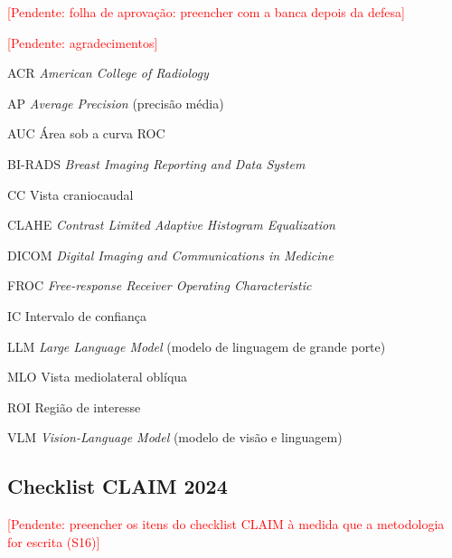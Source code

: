 \documentclass[12pt, openright, oneside, a4paper, chapter=TITLE, english, brazil]{abntex2}
\newcommand{\pendente}[1]{\textcolor{red}{[Pendente: #1]}}
\begin{document}
\frenchspacing

\imprimircapa
\imprimirfolhaderosto

\begin{folhadeaprovacao}
  \pendente{folha de aprovação: preencher com a banca depois da defesa}
\end{folhadeaprovacao}

\begin{agradecimentos}
  \pendente{agradecimentos}
\end{agradecimentos}



\listoffigures*
\cleardoublepage
{}
\listoftables*
\cleardoublepage

\begin{siglas}
  \item[ACR] \textit{American College of Radiology}
  \item[AP] \textit{Average Precision} (precisão média)
  \item[AUC] Área sob a curva ROC
  \item[BI-RADS] \textit{Breast Imaging Reporting and Data System}
  \item[CC] Vista craniocaudal
  \item[CLAHE] \textit{Contrast Limited Adaptive Histogram Equalization}
  \item[DICOM] \textit{Digital Imaging and Communications in Medicine}
  \item[FROC] \textit{Free-response Receiver Operating Characteristic}
  \item[IC] Intervalo de confiança
  \item[LLM] \textit{Large Language Model} (modelo de linguagem de grande porte)
  \item[MLO] Vista mediolateral oblíqua
  \item[ROI] Região de interesse
  \item[VLM] \textit{Vision-Language Model} (modelo de visão e linguagem)
\end{siglas}

\tableofcontents*
\cleardoublepage

\textual







\postextual


\begin{apendicesenv}
\partapendices
\chapter{Checklist CLAIM 2024}
\pendente{preencher os itens do checklist CLAIM \cite{tejani2024claim} à medida que a metodologia for escrita (S16)}
\end{apendicesenv}

\printindex
\end{document}
